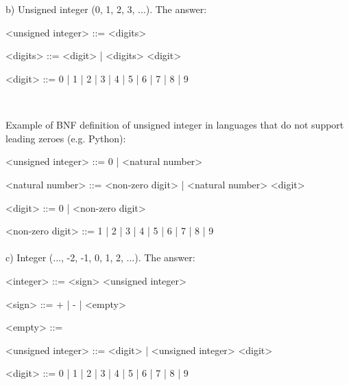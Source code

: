 \documentclass{article}
\begin{document}
	
	\paragraph{}
	\rmfamily\
	
		b) Unsigned integer (0, 1, 2, 3, ...). The answer:
		
	\ttfamily
	\begin{grammar}
		
		<unsigned integer> ::= <digits>
		
		<digits> ::= <digit> | <digits> <digit>

		<digit> ::= 0 | 1 | 2 | 3 | 4 | 5 | 6 | 7 | 8 | 9
		
	\end{grammar}

		\rmfamily\
	
		Example of BNF definition of unsigned integer in languages that do not support leading zeroes (e.g. Python):
			
	\ttfamily
	\begin{grammar}
		
		<unsigned integer> ::= 0 | <natural number>
		
		<natural number> ::= <non-zero digit> | <natural number> <digit>

		<digit> ::= 0 | <non-zero digit>

		<non-zero digit> ::= 1 | 2 | 3 | 4 | 5 | 6 | 7 | 8 | 9
		
	\end{grammar}




	\paragraph{}
	\rmfamily
	
		c) Integer (..., -2, -1, 0, 1, 2, ...). The answer:
			
	\ttfamily
	\begin{grammar}
	
		<integer> ::= <sign> <unsigned integer>
		
		<sign> ::= + | - | <empty>
		
		<empty> ::= \
		
		<unsigned integer> ::= <digit> | <unsigned integer> <digit>

		<digit> ::= 0 | 1 | 2 | 3 | 4 | 5 | 6 | 7 | 8 | 9

	\end{grammar}

		\rmfamily\
	
\end{document}
